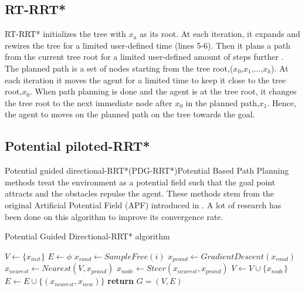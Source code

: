 \documentclass[runningheads]{llncs}
\begin{document}
\subsection{RT-RRT*}
RT-RRT*\cite{RT-RRT*} initializes the tree
with $x_a$ as its root. At each iteration, it expands and rewires the tree for a limited user-defined time (lines 5-6).  Then it plans a path from the current tree root for a limited user-defined amount of steps further . The planned path is a set of nodes starting from the tree root,($x_0$,$x_1$,...,$x_k$).  At each iteration it moves the agent for a limited time to keep it close to the tree root,$x_0$.  When path planning is done and the agent is at the tree root, it changes the tree root to the next immediate node after $x_0$ in the planned path,$x_1$.  Hence, the agent to moves on the planned path on the tree towards the goal.



\vspace{-5mm}
\subsection{Potential piloted-RRT*}
Potential guided directional-RRT*(PDG-RRT*)\cite{potential}Potential Based Path Planning methods treat the environment as a potential field such that the goal point attracts and the obstacles
repulse the agent. These methods stem from the original Artificial
Potential Field (APF) introduced in \cite{potential}.  A lot of research has been done on this algorithm to improve its convergence rate.

\begin{algorithm}
\caption{Potential Guided Directional-RRT* algorithm}\label{alg:PG-RRT}
\begin{algorithmic}[1]
\State $V\gets \{x_{init}\}$
\State $E\gets \phi$
\State $x_{rand}\gets SampleFree(i)$
\State $x_{prand}\gets GradientDescent(x_{rand})$
\State $x_{nearest}\gets Nearest(V, x_{prand})$
\State $x_{node}\gets Steer(x_{nearest}, x_{prand})$
\State $V\gets V \cup \{x_{node}\}$ 
\State $E\gets E \cup \{(x_{nearest}, x_{new})\}$
\EndIf
\EndFor
\State \textbf{return} $G = (V,E )$
\EndProcedure
\end{algorithmic}
\end{algorithm}
\end{document}
